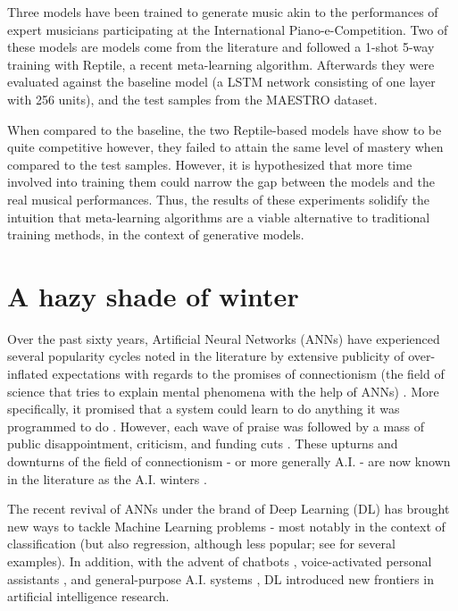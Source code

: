 \documentclass[a4paper]{book}
\begin{document}
Three models have been trained to generate music akin to the performances of expert musicians participating at the International Piano-e-Competition. Two of these models are models come from the literature and followed a 1-shot 5-way training with Reptile, a recent meta-learning algorithm. Afterwards they were evaluated against the baseline model (a LSTM network consisting of one layer with 256 units), and the test samples from the MAESTRO dataset.

When compared to the baseline, the two Reptile-based models have show to be quite competitive however, they failed to attain the same level of mastery when compared to the test samples. However, it is hypothesized that more time involved into training them could narrow the gap between the models and the real musical performances. Thus, the results of these experiments solidify the intuition that meta-learning algorithms are a viable alternative to traditional training methods, in the context of generative models.


\tableofcontents

\chapter{A hazy shade of winter} \label{chap:intro}

Over the past sixty years, Artificial Neural Networks (ANNs) have experienced several popularity cycles noted in the literature by extensive publicity of over-inflated expectations with regards to the promises of connectionism (the field of science that tries to explain mental phenomena with the help of ANNs) \parencite{minsky_perceptrons_1988, knight_ai_2016, nilsson_speed_2009}. More specifically, it promised that a system could learn to do anything it was programmed to do \parencite{minsky_perceptrons_1988}. However, each wave of praise was followed by a mass of public disappointment, criticism, and funding cuts \parencite[e.g.,][]{lighthill_artificial_1972}. These upturns and downturns of the field of connectionism - or more generally A.I. - are now known in the literature as the A.I. winters \parencite{nilsson_speed_2009}.

The recent revival of ANNs under the brand of Deep Learning (DL) has brought new ways to tackle Machine Learning problems - most notably in the context of classification (but also regression, although less popular; see \cite{lecun_deep_2015} for several examples). In addition, with the advent of chatbots \parencite{dale_return_2016}, voice-activated personal assistants \parencite{xiong_microsoft_2018}, and general-purpose A.I. systems \parencite{vinyals_starcraft_2017}, DL introduced new frontiers in artificial intelligence research.
\end{document}
